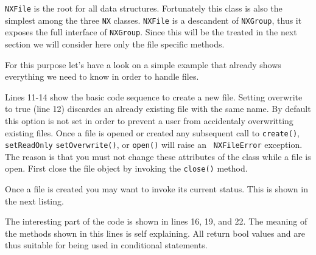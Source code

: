 {\tt NXFile} is the root for all data structures. 
Fortunately this class is also the simplest among the three {\tt NX} classes.
{\tt NXFile} is a descandent of {\tt NXGroup}, thus it exposes the full 
interface of {\tt NXGroup}. Since this will be the treated in the next 
section we will consider here only the file specific methods. 

For this purpose let's have a look on a simple example that already shows
everything we need to know in order to handle files. 

Lines 11-14 show the basic code sequence to create a new file. Setting 
overwrite to true (line 12) discardes an already existing file with the
same name. By default this option is not set in order to prevent a user 
from accidentaly overwritting existing files.
Once a file is opened or created any subsequent call to {\tt create()}, {\tt
setReadOnly} {\tt setOverwrite()}, or {\tt open()} will raise an  {\tt
NXFileError} exception.
The reason is that you must not change these attributes of the class 
while a file is open. First close the file object by invoking the 
{\tt close()} method. 

Once a file is created you may want to invoke its current status. 
This is shown in the next listing.

The interesting part of the code is shown in lines 16, 19, and 22.
The meaning of the methods shown in this lines is self explaining. 
All return bool values and are thus suitable for being used in 
conditional statements. 

